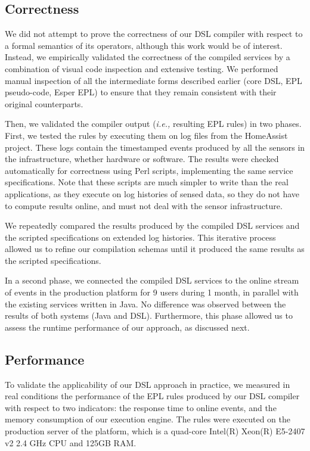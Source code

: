 \subsection{Correctness}\label{validation:results}

We did not attempt to prove the correctness of our DSL compiler with respect to a formal semantics of its operators, although this work would be of interest. Instead, we empirically validated the correctness of the compiled services by a combination of visual code inspection and extensive testing. We performed manual inspection of all the intermediate forms described earlier (core DSL, EPL pseudo-code, Esper EPL) to ensure that they remain consistent with their original counterparts.


Then, we validated the compiler output ({\em i.e.,} resulting EPL rules) in two phases. First, we tested the rules by executing them on log files from the HomeAssist project. These logs contain the timestamped events produced by all the sensors in the infrastructure, whether hardware or software. The results were checked automatically for correctness using Perl scripts, implementing the same service specifications. Note that these scripts are much simpler to write than the real applications, as they execute on log histories of sensed data, so they do not have to compute results online, and must not deal with the sensor infrastructure.

We repeatedly compared the results produced by the compiled DSL services and the scripted specifications on extended log histories. This iterative process allowed us to refine our compilation schemas until it produced the same results as the scripted specifications.

In a second phase, we connected the compiled DSL services to the online stream of events in the production platform for 9 users during 1 month, in parallel with the existing services written in Java. No difference was observed between the results of both systems (Java and DSL). Furthermore, this phase allowed us to assess the runtime performance of our approach, as discussed next.


\subsection{Performance}\label{validation:performance}
To validate the applicability of our DSL approach in practice, we measured in real conditions the performance of the EPL rules produced by our DSL compiler with respect to two indicators: the response time to online events, and the memory consumption of our execution engine. The rules were executed on the production server of the platform, which is a quad-core Intel(R) Xeon(R) E5-2407 v2 2.4 GHz CPU and 125GB RAM.

